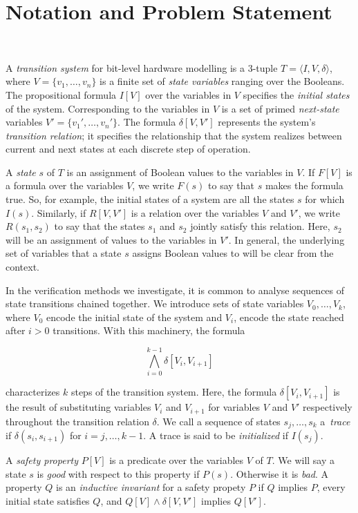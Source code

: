 \section{Notation and Problem Statement}~\label{sec:notation}

A \textit{transition system} for bit-level hardware
modelling is a 3-tuple $T = \langle I,V,\delta \rangle$, where $V = \{v_1,\dots ,v_n\}$
is a finite set of \textit{state variables} ranging over the Booleans.
The propositional formula $I[V]$ over the variables in 
$V$ specifies the \textit{initial states} of the system. 
Corresponding to the variables in $V$ is a set of primed \textit{next-state} variables $V' = \{v_1', \dots, v_n'\}$.
The formula $\delta[V,V']$ represents the system's \textit{transition relation}; it specifies the relationship that the system realizes between current and next states at each discrete step of operation.

A \textit{state} $s$ of $T$ is an assignment of Boolean values to the variables in $V$.
If $F[V]$ is a formula over the variables $V$, we write $F(s)$ to say that $s$ makes the formula true.
So, for example, the initial states of a system are all the states $s$ for which $I(s)$. Similarly, if $R[V,V']$ is a relation over the variables $V$ and $V'$, we write $R(s_1,s_2)$ to say that the states $s_1$ and $s_2$ jointly satisfy this relation. Here, $s_2$ will be an assignment of values to the variables in $V'$. In general, 
the underlying set of variables that a state $s$ assigns Boolean values to will be clear from the context.

In the verification methods we investigate, it is common to analyse sequences of state transitions chained together.
We introduce sets of state variables $V_0, \dots, V_k$, where $V_0$ encode the initial state of the system and $V_i$, encode the state reached after $i>0$ transitions. With this machinery, the formula

\[ \bigwedge_{i{=}0}^{k{-}1}\delta[V_i, V_{i+1}]\] 

\noindent characterizes $k$ steps of the transition system. Here, the formula $\delta[V_i, V_{i+1}]$ is the result of 
substituting variables $V_i$ and $V_{i+1}$ for variables $V$ and $V'$ respectively throughout the transition relation $\delta$. We call a sequence of states $s_j,\dots,s_k$ a~\textit{trace} if $\delta(s_i,s_{i{+}1})$ for $i=j,\dots,k{-}1$.  A trace is said to be \textit{initialized} if $I(s_j)$.
  
A \textit{safety property} $P[V]$ is a predicate over the variables $V$ of $T$.  We will
say a state $s$ is \textit{good} with respect to this property if $P(s)$. Otherwise it is \textit{bad}.
A property $Q$ is an \textit{inductive invariant} for a safety propety $P$ if $Q$ implies $P$, every initial state satisfies $Q$, and $Q[V] \wedge \delta[V,V']$ implies $Q[V']$.

